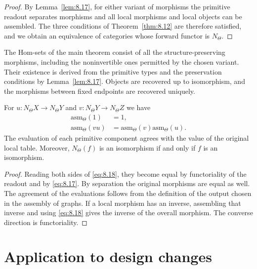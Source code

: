 \begin{proof}

By Lemma~\ref{lem:8.17}, for either variant of morphisms the primitive readout separates
morphisms and all local morphisms and local objects can be assembled.
The three conditions of Theorem~\ref{thm:8.12} are therefore satisfied, and we obtain an
equivalence of categories whose forward functor is $N_\Theta$.

\end{proof}

The Hom-sets of the main theorem consist of all the structure-preserving morphisms,
including the
noninvertible ones permitted by the chosen variant.
Their existence is derived from the primitive types and the preservation conditions by
Lemma~\ref{lem:8.17}.
Objects are recovered up to isomorphism, and the morphisms between fixed endpoints are
recovered uniquely.

\begin{corollary}\label{cor:8.19}

For $u:N_\Theta X\to N_\Theta Y$ and
$v:N_\Theta Y\to N_\Theta Z$ we have
\begin{equation*}
\begin{aligned}
\mathrm{asm}_\Theta(1)&=1,\\
\mathrm{asm}_\Theta(vu)
&=\mathrm{asm}_\Theta(v)\mathrm{asm}_\Theta(u).
\end{aligned}
\tag{8.18}\label{eq:8.18}
\end{equation*}
The evaluation of each primitive component agrees with the value of the original local table.
Moreover, $N_\Theta(f)$ is an isomorphism if and only if $f$ is an isomorphism.

\end{corollary}

\begin{proof}

Reading both sides of \eqref{eq:8.18}, they become equal by functoriality of the readout and
by \eqref{eq:8.17}.
By separation the original morphisms are equal as well.
The agreement of the evaluations follows from the definition of the output chosen in the
assembly of graphs.
If a local morphism has an inverse, assembling that inverse and using \eqref{eq:8.18} gives
the inverse of the overall morphism.
The converse direction is functoriality.

\end{proof}

\section{Application to design changes}\label{sec:8.6}

